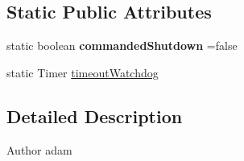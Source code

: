 \subsection*{Static Public Attributes}
\begin{DoxyCompactItemize}
\item 
\hypertarget{classCASUAL_1_1CASUALDataBridge_a3f1cf8cee5785332eac767cbd20041f2}{static boolean {\bfseries commanded\-Shutdown} =false}\label{classCASUAL_1_1CASUALDataBridge_a3f1cf8cee5785332eac767cbd20041f2}

\item 
static Timer \hyperlink{classCASUAL_1_1CASUALDataBridge_a2f95d8ec4d06f75bf5e089658604e46d}{timeout\-Watchdog}
\end{DoxyCompactItemize}


\subsection{Detailed Description}
\begin{DoxyAuthor}{Author}
adam 
\end{DoxyAuthor}


